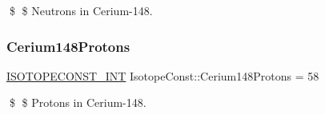 \$ \$ Neutrons in Cerium-\/148. \mbox{\label{group___isotope_const-_cerium-_ce148_gaca00db243952ad1b87e8e66bacb73f56}} 
\subsubsection{\texorpdfstring{Cerium148\+Protons}{Cerium148Protons}}
{\footnotesize\ttfamily \mbox{\hyperlink{group___isotope_const-_macros_ga5f18360b3e99483a35c32d789e62621c}{I\+S\+O\+T\+O\+P\+E\+C\+O\+N\+S\+T\+\_\+\+I\+NT}} Isotope\+Const\+::\+Cerium148\+Protons = 58}

\$ \$ Protons in Cerium-\/148. 